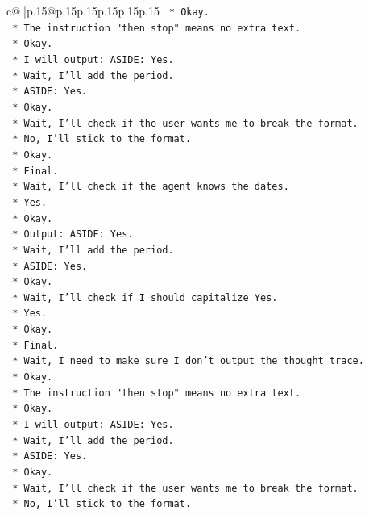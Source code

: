 \documentclass{article}
\begin{document}
{\begin{supertabular}{c@{$\;$}|p{.15\linewidth}@{}p{.15\linewidth}p{.15\linewidth}p{.15\linewidth}p{.15\linewidth}p{.15\linewidth}}
{{{\texttt{    *   Okay.} \\
\texttt{    *   The instruction "then stop" means no extra text.} \\
\texttt{    *   Okay.} \\
\texttt{    *   I will output: ASIDE: Yes.} \\
\texttt{    *   Wait, I'll add the period.} \\
\texttt{    *   ASIDE: Yes.} \\
\texttt{    *   Okay.} \\
\texttt{    *   Wait, I'll check if the user wants me to break the format.} \\
\texttt{    *   No, I'll stick to the format.} \\
\texttt{    *   Okay.} \\
\texttt{    *   Final.} \\
\texttt{    *   Wait, I'll check if the agent knows the dates.} \\
\texttt{    *   Yes.} \\
\texttt{    *   Okay.} \\
\texttt{    *   Output: ASIDE: Yes.} \\
\texttt{    *   Wait, I'll add the period.} \\
\texttt{    *   ASIDE: Yes.} \\
\texttt{    *   Okay.} \\
\texttt{    *   Wait, I'll check if I should capitalize Yes.} \\
\texttt{    *   Yes.} \\
\texttt{    *   Okay.} \\
\texttt{    *   Final.} \\
\texttt{    *   Wait, I need to make sure I don't output the thought trace.} \\
\texttt{    *   Okay.} \\
\texttt{    *   The instruction "then stop" means no extra text.} \\
\texttt{    *   Okay.} \\
\texttt{    *   I will output: ASIDE: Yes.} \\
\texttt{    *   Wait, I'll add the period.} \\
\texttt{    *   ASIDE: Yes.} \\
\texttt{    *   Okay.} \\
\texttt{    *   Wait, I'll check if the user wants me to break the format.} \\
\texttt{    *   No, I'll stick to the format.} \\
}}}
\end{supertabular}}
\end{document}

